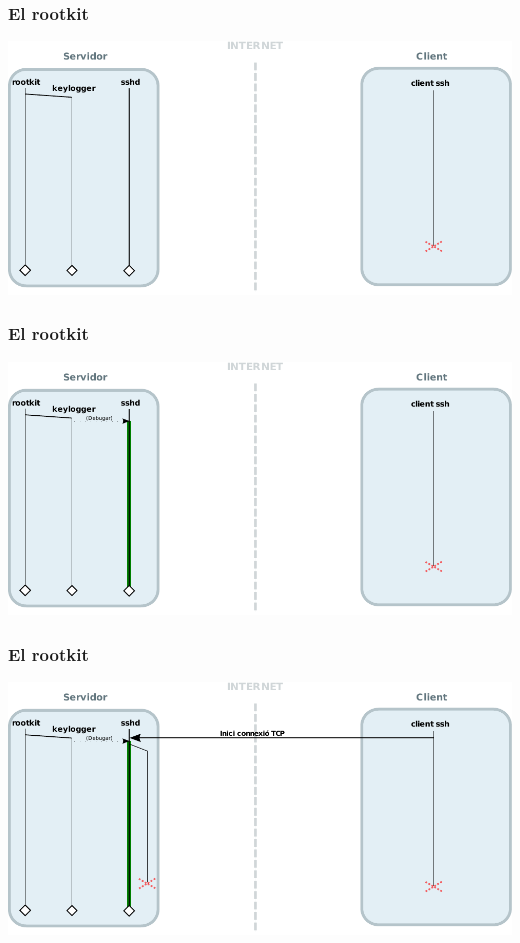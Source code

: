 \documentclass{beamer}
\begin{document}
\begin{frame}
	\frametitle{El rootkit}
	\includegraphics[scale=0.65,keepaspectratio]{sshd_keylogger_2.pdf}
\end{frame}

\begin{frame}
	\frametitle{El rootkit}
	\includegraphics[scale=0.65,keepaspectratio]{sshd_keylogger_3.pdf}
\end{frame}

\begin{frame}
	\frametitle{El rootkit}
	\includegraphics[scale=0.65,keepaspectratio]{sshd_keylogger_4.pdf}
\end{frame}
\end{document}
